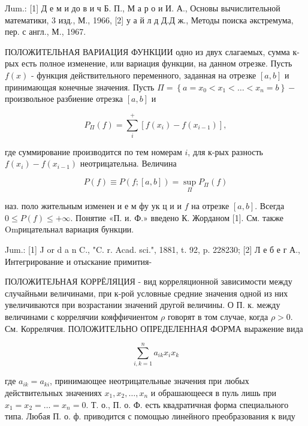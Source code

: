 \documentclass[10pt]{article}
\begin{document}
Лum.: [1] Д е м и до в и ч Б. П., М а р о и И. А., Основы вычислительной математики, 3 изд., М., 1966, [2] у а й л д Д.Д ж., Методы поиска әкстремума, пер. с англ., М., 1967.



ПОЛОЖИТЕЛЬНАЯ ВАРИАЦИЯ ФУНКЦИИ одно из двух слагаемых, сумма к-рых есть полное изменение, или вариация функции, на данном отрезке. Пусть $f(x)$ - функция действительного переменного, заданная на отрезке $[a, b]$ и принимающая конечные значения. Пусть $\Pi=\left\{a=x_{0}<x_{1}<\ldots<x_{n}=b\right\}-$ произвольное разбиение отрезка $[a, b]$ и



\[

P_{\Pi}(f)=\sum_{i}^{+}\left[f\left(x_{i}\right)-f\left(x_{i-1}\right)\right],

\]



где суммирование производится по тем номерам $i$, для к-рых разность $f\left(x_{i}\right)-f\left(x_{i-1}\right)$ неотрицательна. Величина



\[

P(f) \equiv P(f ;[a, b])=\sup _{\Pi} P_{\Pi}(f)

\]



наз. поло жительным изменен и е м фу ук ц и и $f$ на отрезке $[a, b]$. Всегда $0 \leqslant P(f) \leqslant+\infty$. Понятие «П. и. Ф.» введено К. Жорданом [1]. См. также Omрицательнал вариация бункции.



Jum.: [1] J or d a n C., "C. r. Acad. sci.", 1881, t. 92, p. 228230; [2] Л е б е г А., Интегрирование и отыскание примития-



ПОЛОЖИТЕЈЬНАЯ КОРРЁЛЯЦИЯ - вид корреляционной зависимости между случайньми величинами, при к-рой условные средние значения одной из них увеличиваются при возрастании значений другой величины. О П. к. между величинами с коррелячии кояффичиентом $\rho$ говорят в том случае, когда $\rho>0$. См. Коррелячия. ПОЛОЖИТЕЛЬНО ОПРЕДЕЛЕННАЯ ФОРМА выражение вида



\[

\sum_{i, k=1}^{n} a_{i k} x_{i} x_{k}

\]



где $a_{i k}=a_{k i}$, принимающее неотрицательные значения при любых действительных значениях $x_{1}, x_{2}, \ldots, x_{n}$ и обрашающееся в пуль лишь при $x_{1}=x_{2}=\ldots=x_{n}=0$. Т. о., П. о. Ф. есть квадратичная форма специального типа. Любая П. о. ф. приводится с помощью линейного преобразования к виду
\end{document}
